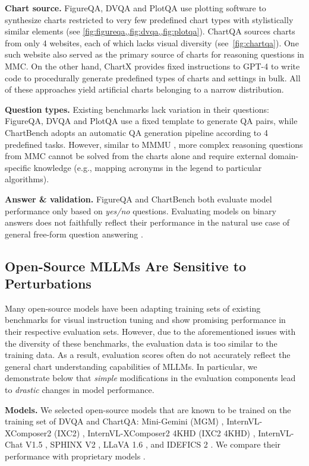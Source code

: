 \textbf{Chart source.   }
FigureQA, DVQA and PlotQA use plotting software to synthesize charts restricted to very few predefined chart types with stylistically similar elements (see \cref{fig:figureqa,,fig:dvqa,,fig:plotqa}).
ChartQA sources charts from only 4 websites, each of which lacks visual diversity (see~\cref{fig:chartqa}).
One such website also served as the primary source of charts for reasoning questions in MMC.
On the other hand, ChartX provides fixed instructions to GPT-4 to write code to procedurally generate predefined types of charts and settings in bulk.
All of these approaches yield artificial charts belonging to a narrow distribution.

\textbf{Question types.}
Existing benchmarks lack variation in their questions: FigureQA, DVQA and PlotQA use a fixed template to generate QA pairs, while ChartBench adopts an automatic QA generation pipeline according to 4 predefined tasks.
However, similar to MMMU \cite{yue2023mmmu}, more complex reasoning questions from MMC cannot be solved from the charts alone and require external domain-specific knowledge (e.g., mapping acronyms in the legend to particular algorithms).

\textbf{Answer \& validation.  }FigureQA and ChartBench both evaluate model performance only based on \emph{yes/no} questions.
Evaluating models on binary answers does not faithfully reflect their performance in the natural use case of general free-form question answering \cite{li2024multiplechoice}. 

\subsection{Open-Source MLLMs Are Sensitive to Perturbations}
\label{subsec:control}


Many open-source models have been adapting training sets of existing benchmarks \cite{kahou2017figureqa, kafle2018dvqa, masry2022chartqa} for visual instruction tuning \cite{liu2023llava} and show promising performance in their respective evaluation sets. However, due to the aforementioned issues with the diversity of these benchmarks, the evaluation data is too similar to the training data. As a result, evaluation scores often do not accurately reflect the general chart understanding capabilities of MLLMs. In particular, we demonstrate below that \textit{simple} modifications in the evaluation components lead to \textit{drastic} changes in model performance.


\textbf{Models.  }We selected open-source models that are known to be trained on the training set of DVQA and ChartQA: Mini-Gemini (MGM) \cite{li2024minigemini}, InternVL-XComposer2 (IXC2) \cite{chen2023internvl}, InternVL-XComposer2 4KHD (IXC2 4KHD) \cite{dong2024internlmxcomposer24khd}, InternVL-Chat V1.5 \cite{chen2024far}, SPHINX V2 \cite{gao2024sphinxx}, LLaVA 1.6 \cite{liu2024llavanext}, and IDEFICS 2 \cite{laurenccon2024matters}.
We compare their performance with proprietary models \cite{openai2024gpt4, claude3, rekateam2024reka}.


